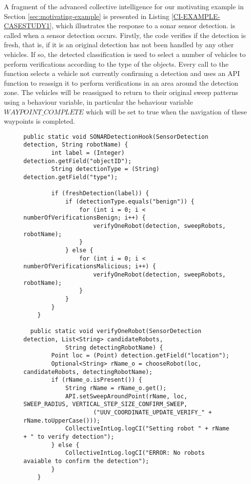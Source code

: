 A fragment of the advanced collective intelligence for our motivating example in
Section \ref{sec:motivating-example} is presented in Listing
\ref{CI-EXAMPLE-CASESTUDY1}, which illustrates the response to a sonar sensor
detection.  is called when a sensor detection
occurs. Firstly, the code verifies if the detection is fresh, that is, if it is
an original detection has not been handled by any other vehicles. If so, the
detected classification is used to select a number of vehicles to perform
verifications according to the type of the objects. Every call to the function
 selects a vehicle not currently confirming a detection
and uses an API function to reassign it to perform verifications in an area
around the detection zone. The vehicles will be reassigned to return to their
original sweep patterns using a behaviour variable, in particular the behaviour
variable \(WAYPOINT\_COMPLETE\) which will be set to true when the navigation of
these waypoints is completed.


\begin{figure}[t]
  \begin{lstlisting}[basicstyle=\scriptsize, caption=CI API fragment example for the motivating example , label={CI-EXAMPLE-CASESTUDY1}]
	public static void SONARDetectionHook(SensorDetection detection, String robotName) {
		int label = (Integer) detection.getField("objectID");
		String detectionType = (String) detection.getField("type");

		if (freshDetection(label)) {
			if (detectionType.equals("benign")) {
				for (int i = 0; i < numberOfVerificationsBenign; i++) {
					verifyOneRobot(detection, sweepRobots, robotName);
				}
			} else {
				for (int i = 0; i < numberOfVerificationsMalicious; i++) {
					verifyOneRobot(detection, sweepRobots, robotName);
				}
			}
		}
	}

  public static void verifyOneRobot(SensorDetection detection, List<String> candidateRobots,
			String detectingRobotName) {
		Point loc = (Point) detection.getField("location");
		Optional<String> rName_o = chooseRobot(loc, candidateRobots, detectingRobotName);
		if (rName_o.isPresent()) {
			String rName = rName_o.get();
			API.setSweepAroundPoint(rName, loc, SWEEP_RADIUS, VERTICAL_STEP_SIZE_CONFIRM_SWEEP,
					("UUV_COORDINATE_UPDATE_VERIFY_" + rName.toUpperCase()));
			CollectiveIntLog.logCI("Setting robot " + rName + " to verify detection");
		} else {
			CollectiveIntLog.logCI("ERROR: No robots avaiable to confirm the detection");
		}
	}
  \end{lstlisting}
\end{figure}
